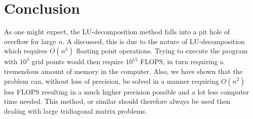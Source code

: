\documentclass[11pt]{article}
\begin{document}
	\section{Conclusion}
		As one might expect, the LU-decomposition method falls into a pit hole of overflow for large $n$. A discussed, this is due to the nature of LU-decomposition which requires $O(n^3)$ floating point operations. Trying to execute the program with $10^5$ grid points would then require $10^{15}$ FLOPS, in turn requiring a tremendous amount of memory in the computer. Also, we have shown that the problem can, without loss of precision, be solved in a manner requiring $O(n^2)$ less FLOPS resulting in a much higher precision possible and a lot less computer time needed. This method, or similar should therefore always be used then dealing with large tridiagonal matrix problems.
		
	
		
	
\end{document}
